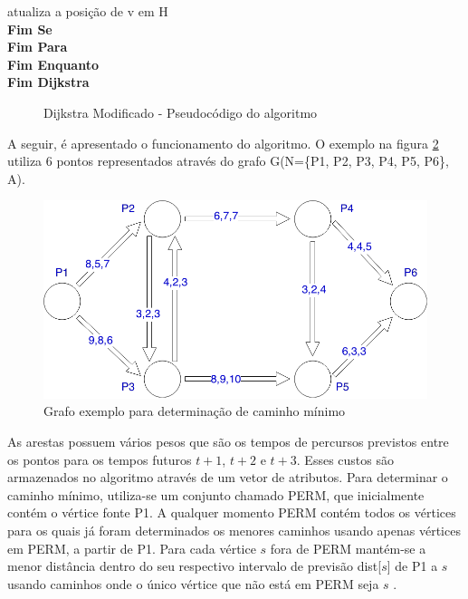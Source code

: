 {\begin{minipage}{70ex}
\vspace*{-1mm} \phantom{} \hspace{12ex} atualiza a posição de v em H\\
\vspace*{-1mm} \phantom{} \hspace{9ex} {\bf Fim Se}\\
\vspace*{-1mm} \phantom{} \hspace{6ex} {\bf Fim Para}\\
\vspace*{-1mm} \phantom{} \hspace{3ex} {\bf Fim Enquanto}\\
\vspace*{-1mm} \phantom{} \hspace{0ex} {\bf Fim Dijkstra}\\
\end{minipage}}
\begin{figure}[htbp]
\centering
\caption{Dijkstra Modificado - Pseudocódigo do algoritmo}
\label{fig:diMod}
\end{figure}
\FloatBarrier

A seguir, é apresentado o funcionamento do algoritmo. O exemplo na figura \ref{fig:leo1} utiliza
6 pontos representados através do grafo G(N=\{P1, P2, P3, P4, P5, P6\}, A).

\begin{figure}[htbp]
\centering
 \includegraphics[width=.50\textwidth]{chapters/fig/leo1.png}
\caption{Grafo exemplo para determinação de caminho mínimo}
\label{fig:leo1}
\end{figure}

As arestas possuem vários pesos que são os tempos de percursos previstos entre os pontos para os tempos
futuros $t + 1$, $t + 2$ e $t + 3$. Esses custos são armazenados no algoritmo através de um vetor de atributos.
Para determinar o caminho mínimo, utiliza-se um conjunto chamado PERM, que inicialmente contém o vértice fonte P1.
A qualquer momento PERM contém todos os vértices para os quais já foram determinados os menores caminhos usando
apenas vértices em PERM, a partir de P1. Para cada vértice $s$ fora de PERM mantém-se a menor distância dentro do
seu respectivo intervalo de previsão dist[$s$] de P1 a $s$ usando caminhos onde o único vértice que não está em
PERM seja $s$ \cite{leonard}.


